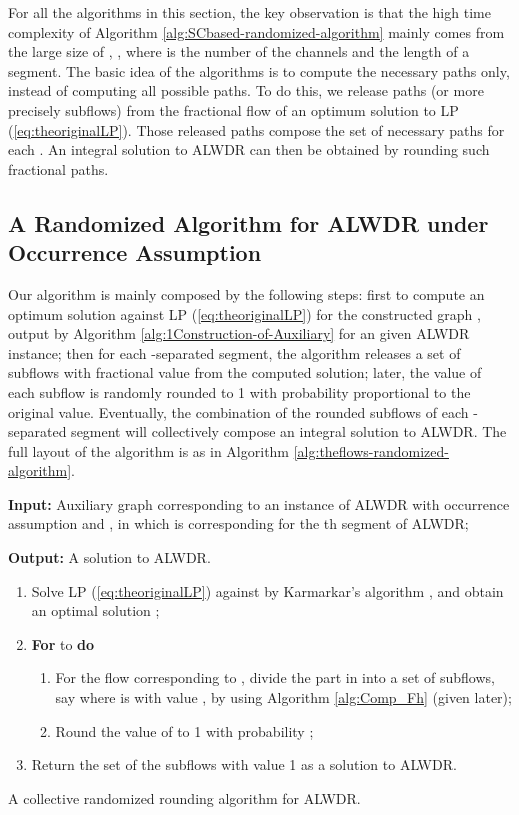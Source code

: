 \documentclass[11pt,english,onecolumn,draftcls]{IEEEtran}
\theoremstyle{plain}
\theoremstyle{plain}
\theoremstyle{plain}
\theoremstyle{plain}
\begin{document}
For all the algorithms in this section, the key observation is that
the high time complexity of Algorithm \ref{alg:SCbased-randomized-algorithm}
mainly comes from the large size of , ,
where  is the number of the channels and  the length
of a segment. The basic idea of the algorithms is to compute the necessary
paths only, instead of computing all possible paths. To do this, we
release paths (or more precisely subflows) from the fractional flow
of an optimum solution to LP (\ref{eq:theoriginalLP}). Those released
paths compose the set of necessary paths for each .
An integral solution to ALWDR can then be obtained
by rounding such fractional paths.


\subsection{A Randomized Algorithm for ALWDR under Occurrence
Assumption}

Our algorithm is mainly composed by the following steps: first to
compute an optimum solution against LP (\ref{eq:theoriginalLP}) for
the constructed graph , output by Algorithm \ref{alg:1Construction-of-Auxiliary}
for an given ALWDR instance; then for each -separated
segment, the algorithm releases a set of subflows with fractional
value from the computed solution; later, the value of each subflow
is randomly rounded to 1 with probability proportional to the original
value. Eventually, the combination of the rounded subflows of each
-separated segment will collectively compose an integral
solution to ALWDR. The full layout of the algorithm
is as in Algorithm \ref{alg:theflows-randomized-algorithm}.

\begin{algorithm}
\textbf{Input: }Auxiliary graph  corresponding to an instance
of ALWDR with occurrence assumption and ,
in which  is corresponding for the th segment of ALWDR;

\textbf{Output:} A solution to ALWDR.
\begin{enumerate}
\item Solve LP (\ref{eq:theoriginalLP}) against  by Karmarkar's algorithm
\cite{schrijver1998theory}, and obtain an optimal solution ;
\item \textbf{For}  to  \textbf{do}

\begin{enumerate}
\item For the flow corresponding to , divide the part in 
into a set of subflows, say 
where  is with value ,  by
using Algorithm \ref{alg:Comp_Fh} (given later);
\item Round the value of  to 1 with probability ;
\end{enumerate}
\item Return the set of the subflows with value 1 as a solution to ALWDR.
\end{enumerate}
\protect\caption{\label{alg:theflows-randomized-algorithm}A collective randomized
rounding algorithm for ALWDR.}
\end{algorithm}
\end{document}
